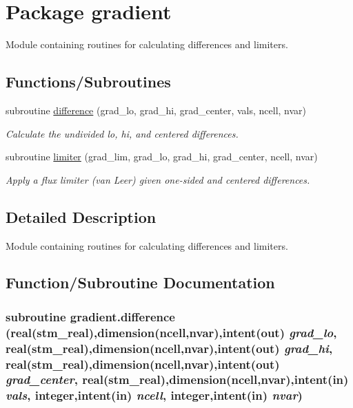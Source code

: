 \hypertarget{a00061}{
\section{Package gradient}
\label{a00061}
}
Module containing routines for calculating differences and limiters.  


\subsection*{Functions/Subroutines}
\begin{CompactItemize}
\item 
subroutine \hyperlink{a00061_2f6957a265ee8b99b78bb9a27a0e64ab}{difference} (grad\_\-lo, grad\_\-hi, grad\_\-center, vals, ncell, nvar)
\begin{CompactList}\small\item\em Calculate the undivided lo, hi, and centered differences. \item\end{CompactList}\item 
subroutine \hyperlink{a00061_64ad308bd281dd6315a927bf0f9721da}{limiter} (grad\_\-lim, grad\_\-lo, grad\_\-hi, grad\_\-center, ncell, nvar)
\begin{CompactList}\small\item\em Apply a flux limiter (van Leer) given one-sided and centered differences. \item\end{CompactList}\end{CompactItemize}


\subsection{Detailed Description}
Module containing routines for calculating differences and limiters. 



\subsection{Function/Subroutine Documentation}
\hypertarget{a00061_2f6957a265ee8b99b78bb9a27a0e64ab}{
\subsubsection[{difference}]{\setlength{\rightskip}{0pt plus 5cm}subroutine gradient.difference (real(stm\_\-real),dimension(ncell,nvar),intent(out) {\em grad\_\-lo}, \/  real(stm\_\-real),dimension(ncell,nvar),intent(out) {\em grad\_\-hi}, \/  real(stm\_\-real),dimension(ncell,nvar),intent(out) {\em grad\_\-center}, \/  real(stm\_\-real),dimension(ncell,nvar),intent(in) {\em vals}, \/  integer,intent(in) {\em ncell}, \/  integer,intent(in) {\em nvar})}}
\label{a00061_2f6957a265ee8b99b78bb9a27a0e64ab}


